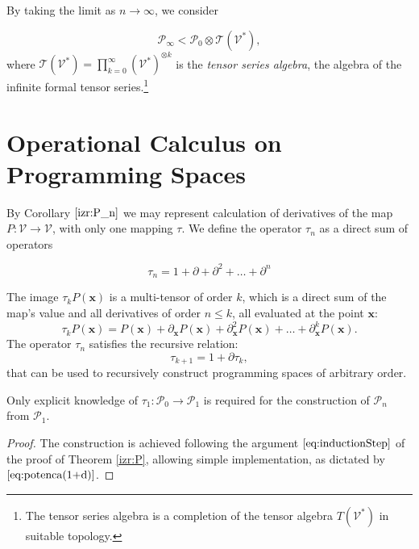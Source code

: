 \documentclass[11pt]{article}
\newcommand{\T}{\mathcal{T}}
\newcommand{\VV}{\mathcal{V}}
\newcommand{\x}{\mathbf{x}}
\newcommand{\dP}{\mathcal{P}}
\newcommand{\D}{\partial}
\newcommand{\sumd}{\tau}
\begin{document}
By taking the limit as $n\to \infty$, we consider 
 	
 	\begin{equation}
 	\label{eq:P_algebra}
 	 	    \dP_\infty < \dP_0\otimes \T(\VV^*),
 	\end{equation}
where $\T(\VV^*)=\prod_{k=0}^\infty (\VV^*)^{\otimes k}$ is the \emph{tensor series
  algebra}, the algebra of the infinite formal tensor series.\footnote{The
  tensor series algebra is a completion of the tensor algebra $T(\VV^*)$ in suitable topology.}

\section{Operational Calculus on Programming Spaces}\label{sec:operational}



By Corollary $\ref{izr:P_n}$ we may represent calculation of derivatives of the
map $P:\VV\to \VV$, with only one mapping $\sumd$. We define the operator
$\sumd_n$ as a direct sum of operators
 
 \begin{equation}\label{eq:DD}
  	\sumd_n = 1+\D +\D^2 +\ldots + \D^n 
  \end{equation}
  
The image $\sumd_kP(\x)$ is a multi-tensor of order $k$, which is a direct sum of the map's value and all derivatives of order $n\le k$, all evaluated at the point $\x$:
\begin{equation}
  \label{eq:multi_odvod}
  \sumd_kP(\x) = P(\mathbf{x})+\partial_\mathbf{x} P(\mathbf{x}) + \partial^2_\mathbf{x} P(\mathbf{x}) + \ldots + \partial^k_\mathbf{x} P(\mathbf{x}).
\end{equation}
The operator $\sumd_n$ satisfies the recursive relation:
  \begin{equation}
    \label{eq:potenca(1+d)}
    \sumd_{k+1}=1+\D\sumd_{k},
  \end{equation}
that can be used to recursively construct programming spaces of arbitrary order. 
\begin{proposition}
Only explicit knowledge of $\sumd_1:\dP_0\to\dP_1$ is required for the
construction of $\dP_n$ from $\dP_1$. 
\end{proposition}
\begin{proof}
  The construction is achieved following the argument $\eqref{eq:inductionStep}$ of the proof of Theorem \ref{izr:P}, allowing simple implementation, as dictated by $\eqref{eq:potenca(1+d)}$. 
\end{proof}
        
\end{document}
